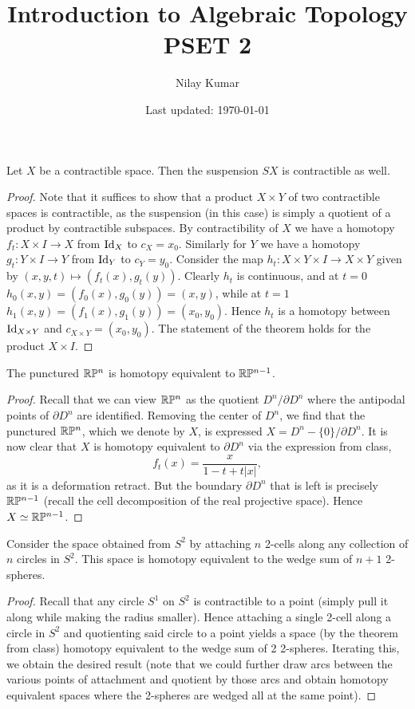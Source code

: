 \documentclass{../../mathnotes}
\title{Introduction to Algebraic Topology PSET 2}
\author{Nilay Kumar}
\date{Last updated: \today}
\begin{document}
\maketitle

\begin{prop}
    Let $X$ be a contractible space. Then the suspension $SX$ is contractible as well.
\end{prop}
\begin{proof}
    Note that it suffices to show that a product $X\times Y$ of two contractible spaces is contractible,
    as the suspension (in this case) is simply a quotient of a product by contractible subspaces.
    By contractibility of $X$ we have a homotopy $f_t:X\times I\to X$ from $\operatorname{Id}_X$ to $c_X=x_0$.
    Similarly for $Y$ we have a homotopy $g_t:Y\times I\to Y$ from $\operatorname{Id}_Y$ to $c_Y=y_0$.
    Consider the map $h_t:X\times Y\times I\to X\times Y$ given by $(x,y,t)\mapsto (f_t(x),g_t(y))$.
    Clearly $h_t$ is continuous, and at $t=0$ $h_0(x,y)=(f_0(x),g_0(y))=(x,y)$, while at $t=1$
    $h_1(x,y)=(f_1(x),g_1(y))=(x_0,y_0)$. Hence $h_t$ is a homotopy between $\operatorname{Id}_{X\times Y}$
    and $c_{X\times Y}=(x_0,y_0)$. The statement of the theorem holds for the product $X\times I$.
\end{proof}

\begin{prop}
    The punctured $\mathbb{R}\mathbb{P}^n$ is homotopy equivalent to $\mathbb{R}\mathbb{P}^{n-1}$.
\end{prop}
\begin{proof}
    Recall that we can view $\mathbb{R}\mathbb{P}^n$ as the quotient $D^n/\partial D^n$ where the antipodal points
    of $\partial D^n$ are identified. Removing the center of $D^n$, we find that the punctured
    $\mathbb{R}\mathbb{P}^n$, which we denote by $X$, is expressed $X=D^n-\{0\}/\partial D^n$. It is
    now clear that $X$ is homotopy equivalent to $\partial D^n$ via the expression from class,
    \[f_t(x)=\frac{x}{1-t+t|x|},\]
    as it is a deformation retract.  But the boundary $\partial D^n$ that is left is
    precisely $\mathbb{R}\mathbb{P}^{n-1}$ (recall the cell decomposition of the real projective space). Hence
    $X\simeq \mathbb{R}\mathbb{P}^{n-1}$.
\end{proof}

\begin{prop}
    Consider the space obtained from $S^2$ by attaching $n$ 2-cells along any collection
    of $n$ circles in $S^2$. This space is homotopy equivalent to the wedge sum of $n+1$
    2-spheres.
\end{prop}
\begin{proof}
    Recall that any circle $S^1$ on $S^2$ is contractible to a point (simply pull it along while
    making the radius smaller). Hence attaching a single
    2-cell along a circle in $S^2$ and quotienting said circle to a point yields a space
    (by the theorem from class) homotopy equivalent to the wedge sum of 2 2-spheres. Iterating this,
    we obtain the desired result (note that we could further draw arcs between the various points
    of attachment and quotient by those arcs and obtain homotopy equivalent spaces where the 2-spheres
    are wedged all at the same point).
\end{proof}
\end{document}
